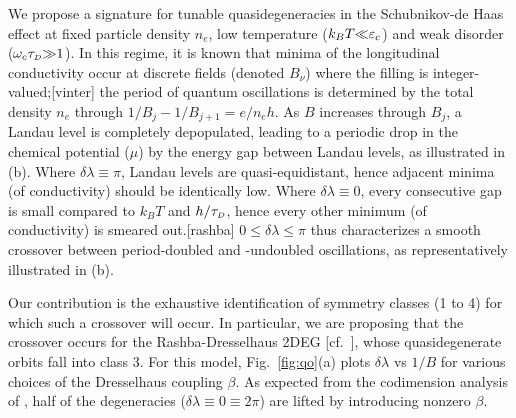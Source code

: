 \documentclass[aps, prb, showpacs, twocolumn, notitlepage, superscriptaddress]{revtex4-1}
\begin{document}
We propose a signature for tunable quasidegeneracies in the  Schubnikov-de Haas effect at fixed particle density $n_e$, low temperature ($k_BT{\ll}\varepsilon_c$) and weak disorder ($\omega_c\tau_{\scriptscriptstyle{D}}{\gg}1$).
In this regime, it is known that minima of the longitudinal conductivity occur at discrete fields (denoted $B_{\nu}$)  where the filling is integer-valued;[vinter] the period of quantum oscillations is determined by the total density $n_e$ through $1/B_j{-}1/B_{j+1}{=}e/n_eh$. As $B$ increases through $B_j$, a Landau level is completely depopulated, leading to a periodic drop in the chemical potential ($\mu$) by the energy gap  between Landau levels, as illustrated in (b). Where $\delta\lambda{\equiv}\pi$, Landau levels are  quasi-equidistant, hence adjacent minima (of conductivity) should be identically low. Where $\delta\lambda{\equiv}0$, every consecutive gap is small compared to $k_BT$ and $h/\tau_{\scriptscriptstyle{D}}$, hence every other  minimum (of conductivity) is smeared out.[rashba] $0{\leq}\delta\lambda{\leq}{\pi}$ thus characterizes a smooth crossover between period-doubled and -undoubled oscillations, as representatively illustrated in (b).


Our contribution is the exhaustive  identification of symmetry classes (1 to 4) for which such a crossover will occur. In particular, we are proposing that the crossover occurs for the Rashba-Dresselhaus 2DEG [cf.\ ], whose quasidegenerate orbits fall into class 3. For this model,  Fig.\ \ref{fig:qo}(a) plots $\delta \lambda$ vs $1/B$ for various choices of the Dresselhaus coupling $\beta$. As expected from the codimension analysis of , half of the degeneracies ($\delta\lambda {\equiv}0{\equiv}2\pi$) are lifted by introducing nonzero $\beta$. 
\end{document}
